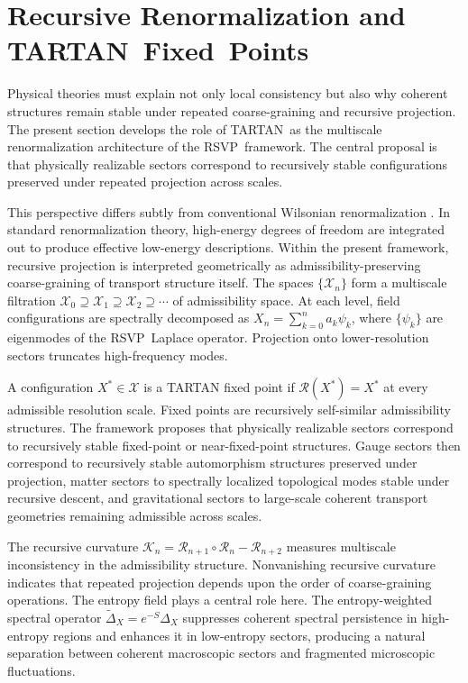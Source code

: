 \documentclass[12pt,a4paper]{article}
\newcommand{\RSVP}{\textrm{RSVP}}
\newcommand{\TARTAN}{\textrm{TARTAN}}
\begin{document}
\section{Recursive Renormalization and \TARTAN\ Fixed\ Points}

Physical theories must explain not only local consistency but also why coherent
structures remain stable under repeated coarse-graining and recursive
projection. The present section develops the role of \TARTAN\ as the multiscale
renormalization architecture of the \RSVP\ framework. The central proposal is
that physically realizable sectors correspond to recursively stable configurations
preserved under repeated projection across scales.

This perspective differs subtly from conventional Wilsonian renormalization
\cite{Wilson1975}. In standard renormalization theory, high-energy degrees of
freedom are integrated out to produce effective low-energy descriptions. Within
the present framework, recursive projection is interpreted geometrically as
admissibility-preserving coarse-graining of transport structure itself. The
spaces $\{\mathcal{X}_n\}$ form a multiscale filtration
$\mathcal{X}_0\supseteq\mathcal{X}_1\supseteq\mathcal{X}_2\supseteq\cdots$
of admissibility space. At each level, field configurations are spectrally
decomposed as $X_n=\sum_{k=0}^n a_k\psi_k$, where $\{\psi_k\}$ are eigenmodes
of the \RSVP\ Laplace operator. Projection onto lower-resolution sectors
truncates high-frequency modes.

A configuration $X^\ast\in\mathcal{X}$ is a TARTAN fixed point if
$\mathcal{R}(X^\ast)=X^\ast$ at every admissible resolution scale. Fixed points
are recursively self-similar admissibility structures. The framework proposes
that physically realizable sectors correspond to recursively stable fixed-point
or near-fixed-point structures. Gauge sectors then correspond to recursively
stable automorphism structures preserved under projection, matter sectors to
spectrally localized topological modes stable under recursive descent, and
gravitational sectors to large-scale coherent transport geometries remaining
admissible across scales.

The recursive curvature $\mathcal{K}_n=\mathcal{R}_{n+1}\circ\mathcal{R}_n-\mathcal{R}_{n+2}$
measures multiscale inconsistency in the admissibility structure. Nonvanishing
recursive curvature indicates that repeated projection depends upon the order of
coarse-graining operations. The entropy field plays a central role here. The
entropy-weighted spectral operator $\widetilde{\Delta}_X=e^{-S}\Delta_X$
suppresses coherent spectral persistence in high-entropy regions and enhances
it in low-entropy sectors, producing a natural separation between coherent
macroscopic sectors and fragmented microscopic fluctuations.
\end{document}
